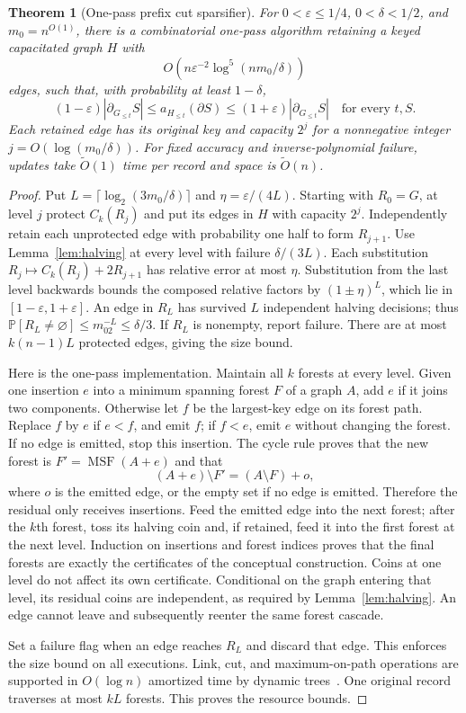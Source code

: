 \documentclass[11pt]{article}
\newtheorem{theorem}{Theorem}[section]
\theoremstyle{definition}
\newcommand{\Prb}{\mathbb P}
\newcommand{\wt}{\widetilde}
\newcommand{\cut}{\partial}
\DeclareMathOperator{\MSF}{MSF}
\begin{document}
\begin{theorem}[One-pass prefix cut sparsifier]\label{thm:prefix}
For $0<\varepsilon\le1/4$, $0<\delta<1/2$, and $m_0=n^{O(1)}$, there is
a combinatorial one-pass algorithm retaining a keyed capacitated graph $H$
with
\[
 O\!\left(n\varepsilon^{-2}\log^5(nm_0/\delta)\right)
\]
edges, such that, with probability at least $1-\delta$,
\begin{equation}\label{eq:prefix}
 (1-\varepsilon)|\cut_{G_{\le t}}S|
 \le a_{H_{\le t}}(\cut S)
 \le(1+\varepsilon)|\cut_{G_{\le t}}S|
 \quad\text{for every }t,S.
\end{equation}
Each retained edge has its original key and capacity $2^j$ for a
nonnegative integer $j=O(\log(m_0/\delta))$. For fixed accuracy and
inverse-polynomial failure, updates take $\wt O(1)$ time per record
and space is $\wt O(n)$.
\end{theorem}
\begin{proof}
Put $L=\lceil\log_2(3m_0/\delta)\rceil$ and
$\eta=\varepsilon/(4L)$.
Starting with $R_0=G$, at level $j$ protect $C_k(R_j)$ and put its
edges in $H$ with capacity $2^j$. Independently retain each unprotected
edge with probability one half to form $R_{j+1}$. Use
Lemma~\ref{lem:halving} at every level with failure $\delta/(3L)$.
Each substitution $R_j\mapsto C_k(R_j)+2R_{j+1}$ has relative error at
most $\eta$. Substitution from the last level backwards bounds the
composed relative factors by $(1\pm\eta)^L$, which lie in
$[1-\varepsilon,1+\varepsilon]$. An edge in $R_L$ has survived $L$
independent halving decisions; thus
$\Prb[R_L\ne\varnothing]\le m_02^{-L}\le\delta/3$.
If $R_L$ is nonempty, report failure. There are at most $k(n-1)L$
protected edges, giving the size bound.

Here is the one-pass implementation. Maintain all $k$ forests at every
level. Given one insertion $e$ into a minimum spanning forest $F$ of a graph
$A$, add $e$ if it joins two components. Otherwise let $f$ be the
largest-key edge on its forest path. Replace $f$ by $e$ if $e<f$,
and emit $f$; if $f<e$, emit $e$ without changing the forest.
If no edge is emitted, stop this insertion. The cycle rule proves that
the new forest is $F'=\MSF(A+e)$ and that
\[
 (A+e)\setminus F'=(A\setminus F)+o,
\]
where $o$ is the emitted edge, or the empty set if no edge is emitted.
Therefore the residual only receives insertions. Feed the emitted edge
into the next forest; after the $k$th forest, toss its halving coin and,
if retained, feed it into the first forest at the next level.
Induction on insertions and forest indices proves that the final forests
are exactly the certificates of the conceptual construction.
Coins at one level do not affect its own certificate. Conditional on the
graph entering that level, its residual coins are independent, as required
by Lemma~\ref{lem:halving}. An edge cannot leave and subsequently reenter
the same forest cascade.

Set a failure flag when an edge reaches $R_L$ and discard that edge.
This enforces the size bound on all executions. Link, cut, and
maximum-on-path operations are supported in $O(\log n)$ amortized time
by dynamic trees~\cite{ST83}. One original record traverses at most $kL$
forests. This proves the resource bounds.
\end{proof}
\end{document}
